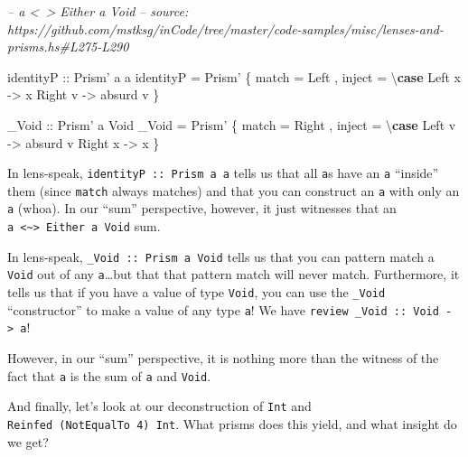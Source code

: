\documentclass[]{article}
\newenvironment{Shaded}{}{}
\newcommand{\CommentTok}[1]{\textcolor[rgb]{0.38,0.63,0.69}{\textit{#1}}}
\newcommand{\DataTypeTok}[1]{\textcolor[rgb]{0.56,0.13,0.00}{#1}}
\newcommand{\FunctionTok}[1]{\textcolor[rgb]{0.02,0.16,0.49}{#1}}
\newcommand{\KeywordTok}[1]{\textcolor[rgb]{0.00,0.44,0.13}{\textbf{#1}}}
\newcommand{\NormalTok}[1]{#1}
\newcommand{\OtherTok}[1]{\textcolor[rgb]{0.00,0.44,0.13}{#1}}
\begin{document}
\begin{Shaded}
\begin{Highlighting}[]
\CommentTok{-- a <~> Either a Void}
\CommentTok{-- source: https://github.com/mstksg/inCode/tree/master/code-samples/misc/lenses-and-prisms.hs#L275-L290}

\OtherTok{identityP ::} \DataTypeTok{Prism'}\NormalTok{ a a}
\NormalTok{identityP }\FunctionTok{=} \DataTypeTok{Prism'}
\NormalTok{    \{ match }\FunctionTok{=} \DataTypeTok{Left}
\NormalTok{    , inject }\FunctionTok{=}\NormalTok{ \textbackslash{}}\KeywordTok{case}
        \DataTypeTok{Left}\NormalTok{  x }\OtherTok{->}\NormalTok{ x}
        \DataTypeTok{Right}\NormalTok{ v }\OtherTok{->}\NormalTok{ absurd v}
\NormalTok{    \}}

\OtherTok{_Void ::} \DataTypeTok{Prism'}\NormalTok{ a }\DataTypeTok{Void}
\NormalTok{_Void }\FunctionTok{=} \DataTypeTok{Prism'}
\NormalTok{    \{ match }\FunctionTok{=} \DataTypeTok{Right}
\NormalTok{    , inject }\FunctionTok{=}\NormalTok{ \textbackslash{}}\KeywordTok{case}
        \DataTypeTok{Left}\NormalTok{  v }\OtherTok{->}\NormalTok{ absurd v}
        \DataTypeTok{Right}\NormalTok{ x }\OtherTok{->}\NormalTok{ x}
\NormalTok{    \}}
\end{Highlighting}
\end{Shaded}

In lens-speak, \texttt{identityP\ ::\ Prism\textquotesingle{}\ a\ a} tells us
that all \texttt{a}s have an \texttt{a} ``inside'' them (since \texttt{match}
always matches) and that you can construct an \texttt{a} with only an \texttt{a}
(whoa). In our ``sum'' perspective, however, it just witnesses that an
\texttt{a\ \textless{}\textasciitilde{}\textgreater{}\ Either\ a\ Void} sum.

In lens-speak, \texttt{\_Void\ ::\ Prism\textquotesingle{}\ a\ Void} tells us
that you can pattern match a \texttt{Void} out of any \texttt{a}\ldots{}but that
that pattern match will never match. Furthermore, it tells us that if you have a
value of type \texttt{Void}, you can use the \texttt{\_Void} ``constructor'' to
make a value of any type \texttt{a}! We have
\texttt{review\ \_Void\ ::\ Void\ -\textgreater{}\ a}!

However, in our ``sum'' perspective, it is nothing more than the witness of the
fact that \texttt{a} is the sum of \texttt{a} and \texttt{Void}.

And finally, let's look at our deconstruction of \texttt{Int} and
\texttt{Reinfed\ (NotEqualTo\ 4)\ Int}. What prisms does this yield, and what
insight do we get?
\end{document}
